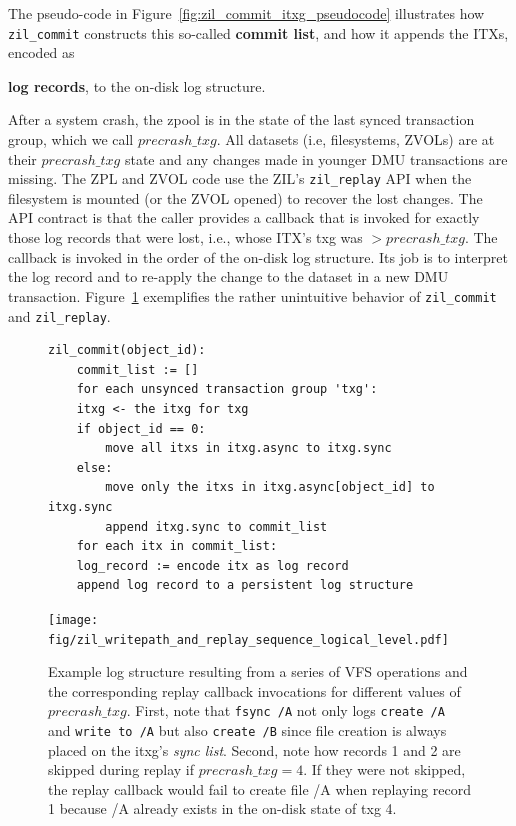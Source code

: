 \documentclass[12pt,a4paper,twoside]{book}
\begin{document}
The pseudo-code in Figure~\ref{fig:zil_commit_itxg_pseudocode} illustrates how \lstinline{zil_commit} constructs this so-called \textbf{commit list}, and how it appends the ITXs, encoded as {\textbf{log records}, to the on-disk log structure.

After a system crash, the zpool is in the state of the last synced transaction group, which we call $precrash\_txg$.
All datasets (i.e, filesystems, ZVOLs) are at their $precrash\_txg$ state and any changes made in younger DMU transactions are missing.
The ZPL and ZVOL code use the ZIL's \lstinline{zil_replay} API when the filesystem is mounted (or the ZVOL opened) to recover the lost changes.
The API contract is that the caller provides a callback that is invoked for exactly those log records that were lost, i.e., whose ITX's txg was $> precrash\_txg$.
The callback is invoked in the order of the on-disk log structure.
Its job is to interpret the log record and to re-apply the change to the dataset in a new DMU transaction.
Figure~\ref{fig:zil_writepath_and_replay_sequence_logical_level} exemplifies the rather unintuitive behavior of \lstinline{zil_commit} and \lstinline{zil_replay}.

\begin{figure}[H]
\begin{lstlisting}[style=figurepseudocode]
zil_commit(object_id):
    commit_list := []
    for each unsynced transaction group 'txg':
    itxg <- the itxg for txg
    if object_id == 0:
        move all itxs in itxg.async to itxg.sync
    else:
        move only the itxs in itxg.async[object_id] to itxg.sync
        append itxg.sync to commit_list
    for each itx in commit_list:
    log_record := encode itx as log record
    append log record to a persistent log structure
\end{lstlisting}
\caption{Pseudo-code that illustrates how \lstinline{zil_commit} constructs the commit list from the \textit{itxg} structure.}
\label{fig:zil_commit_itxg_pseudocode}

\vspace{1cm}

    \centering
    \texttt{[image: fig/zil\_writepath\_and\_replay\_sequence\_logical\_level.pdf]}
    \caption{
        Example log structure resulting from a series of VFS operations and the corresponding replay callback invocations for different values of $precrash\_txg$.
        First, note that \lstinline{fsync /A} not only logs \lstinline{create /A} and \lstinline{write to /A} but also \lstinline{create /B} since file creation is always placed on the itxg's \textit{sync list}.
        Second, note how records 1 and 2 are skipped during replay if $precrash\_txg = 4$.
        If they were not skipped, the replay callback would fail to create file /A when replaying record 1 because /A already exists in the on-disk state of txg 4.
    }
    \label{fig:zil_writepath_and_replay_sequence_logical_level}
\end{figure}

}
\end{document}
